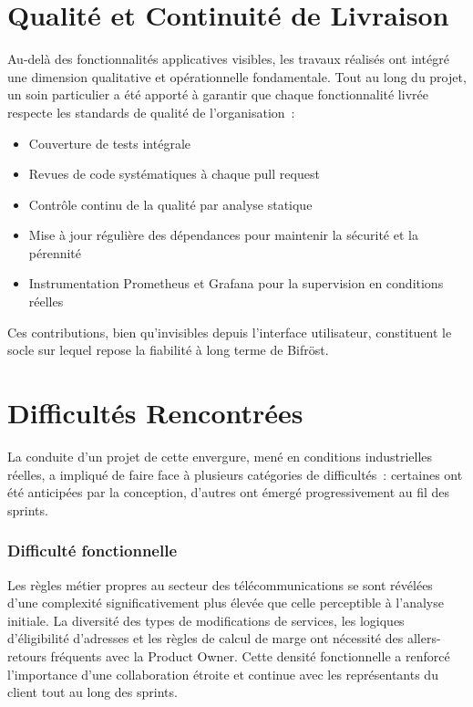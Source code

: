\section{Qualit\'e et Continuit\'e de Livraison}
 
Au-del\`a des fonctionnalit\'es applicatives visibles, les travaux r\'ealis\'es ont int\'egr\'e une dimension qualitative et op\'erationnelle fondamentale. Tout au long du projet, un soin particulier a \'et\'e apport\'e \`a garantir que chaque fonctionnalit\'e livr\'ee respecte les standards de qualit\'e de l'organisation~:

\begin{itemize}
  \item Couverture de tests int\'egrale
  \item Revues de code syst\'ematiques \`a chaque pull request
  \item Contr\^ole continu de la qualit\'e par analyse statique
  \item Mise \`a jour r\'eguli\`ere des d\'ependances pour maintenir la s\'ecurit\'e et la p\'erennit\'e
  \item Instrumentation Prometheus et Grafana pour la supervision en conditions r\'eelles
\end{itemize}

Ces contributions, bien qu'invisibles depuis l'interface utilisateur, constituent le socle sur lequel repose la fiabilit\'e \`a long terme de Bifr\"ost.
 
\section{Difficult\'es Rencontr\'ees}
 
La conduite d'un projet de cette envergure, men\'e en conditions industrielles r\'eelles, a impliqu\'e de faire face \`a plusieurs cat\'egories de difficult\'es~: certaines ont \'et\'e anticip\'ees par la conception, d'autres ont \'emerg\'e progressivement au fil des sprints.
 
\subsubsection*{Difficult\'e fonctionnelle}

Les r\`egles m\'etier propres au secteur des t\'el\'ecommunications se sont r\'ev\'el\'ees d'une complexit\'e significativement plus \'elev\'ee que celle perceptible \`a l'analyse initiale. La diversit\'e des types de modifications de services, les logiques d'\'eligibilit\'e d'adresses et les r\`egles de calcul de marge ont n\'ecessit\'e des allers-retours fr\'equents avec la Product Owner. Cette densit\'e fonctionnelle a renforc\'e l'importance d'une collaboration \'etroite et continue avec les repr\'esentants du client tout au long des sprints.
 
